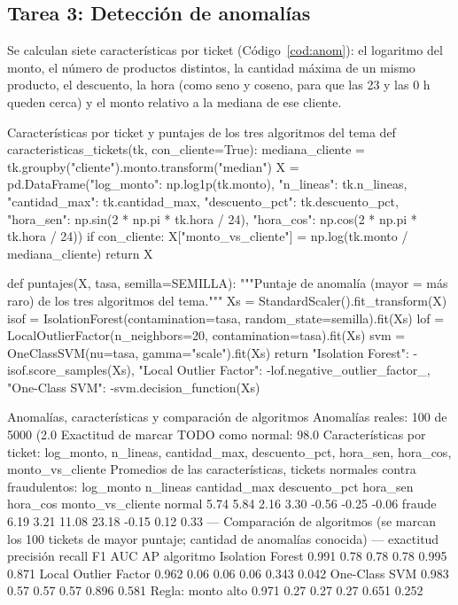 \documentclass[11pt,letterpaper]{article}
\begin{document}
\subsection{Tarea 3: Detección de anomalías}

Se calculan siete características por ticket (Código~\ref{cod:anom}): el logaritmo del monto, el número de productos distintos, la cantidad máxima de un mismo producto, el descuento, la hora (como seno y coseno, para que las 23 y las 0 h queden cerca) y el monto relativo a la mediana de ese cliente.

\begin{codigo}[label=cod:anom]{Características por ticket y puntajes de los tres algoritmos del tema}
def caracteristicas_tickets(tk, con_cliente=True):
    mediana_cliente = tk.groupby("cliente").monto.transform("median")
    X = pd.DataFrame({"log_monto": np.log1p(tk.monto), "n_lineas": tk.n_lineas, "cantidad_max": tk.cantidad_max,
                      "descuento_pct": tk.descuento_pct, "hora_sen": np.sin(2 * np.pi * tk.hora / 24),
                      "hora_cos": np.cos(2 * np.pi * tk.hora / 24)})
    if con_cliente:
        X["monto_vs_cliente"] = np.log(tk.monto / mediana_cliente)
    return X


def puntajes(X, tasa, semilla=SEMILLA):
    """Puntaje de anomalía (mayor = más raro) de los tres algoritmos del tema."""
    Xs = StandardScaler().fit_transform(X)
    isof = IsolationForest(contamination=tasa, random_state=semilla).fit(Xs)
    lof = LocalOutlierFactor(n_neighbors=20, contamination=tasa).fit(Xs)
    svm = OneClassSVM(nu=tasa, gamma="scale").fit(Xs)
    return {"Isolation Forest": -isof.score_samples(Xs), "Local Outlier Factor": -lof.negative_outlier_factor_,
            "One-Class SVM": -svm.decision_function(Xs)}
\end{codigo}

\begin{consola}[label=out:anom1]{Anomalías, características y comparación de algoritmos}
Anomalías reales: 100 de 5000 (2.0%
Exactitud de marcar TODO como normal: 98.0%
Características por ticket: log_monto, n_lineas, cantidad_max, descuento_pct, hora_sen, hora_cos, monto_vs_cliente
Promedios de las características, tickets normales contra fraudulentos:
        log_monto  n_lineas  cantidad_max  descuento_pct  hora_sen  hora_cos  monto_vs_cliente
normal       5.74      5.84          2.16           3.30     -0.56     -0.25             -0.06
fraude       6.19      3.21         11.08          23.18     -0.15      0.12              0.33
--- Comparación de algoritmos (se marcan los 100 tickets de mayor puntaje; cantidad de anomalías conocida) ---
                      exactitud  precisión  recall    F1    AUC     AP
algoritmo
Isolation Forest          0.991       0.78    0.78  0.78  0.995  0.871
Local Outlier Factor      0.962       0.06    0.06  0.06  0.343  0.042
One-Class SVM             0.983       0.57    0.57  0.57  0.896  0.581
Regla: monto alto         0.971       0.27    0.27  0.27  0.651  0.252
\end{consola}
\end{document}
